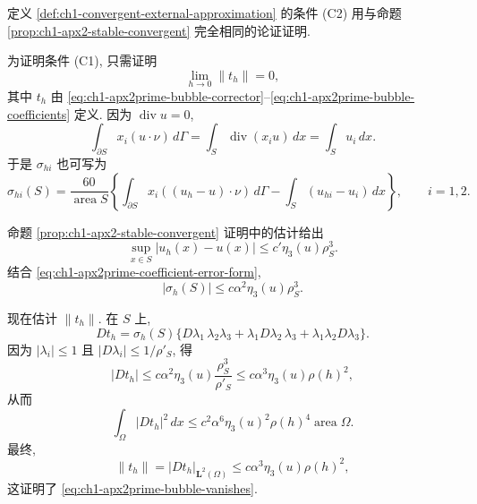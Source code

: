 \begin{Proof}
定义 \ref{def:ch1-convergent-external-approximation} 的条件 (C2) 用与命题 \ref{prop:ch1-apx2-stable-convergent} 完全相同的论证证明.

为证明条件 (C1), 只需证明
\begin{equation}
\lim_{h\to0}\|t_h\|=0,
\label{eq:ch1-apx2prime-bubble-vanishes}
\end{equation}
其中 $t_h$ 由 \eqref{eq:ch1-apx2prime-bubble-corrector}--\eqref{eq:ch1-apx2prime-bubble-coefficients} 定义. 因为 $\operatorname{div}u=0$,
\[
\int_{\partial S}x_i(u\cdot\nu)\,d\Gamma
=\int_S\operatorname{div}(x_iu)\,dx
=\int_Su_i\,dx.
\]
于是 $\sigma_{hi}$ 也可写为
\begin{equation}
\sigma_{hi}(S)
=\frac{60}{\operatorname{area}S}
\left\{\int_{\partial S}x_i((u_h-u)\cdot\nu)\,d\Gamma
-\int_S(u_{hi}-u_i)\,dx\right\},
\qquad i=1,2.
\label{eq:ch1-apx2prime-coefficient-error-form}
\end{equation}

命题 \ref{prop:ch1-apx2-stable-convergent} 证明中的估计给出
\begin{equation}
\sup_{x\in S}|u_h(x)-u(x)|
\leq c'\eta_3(u)\rho_S^3.
\label{eq:ch1-apx2prime-primary-uniform-error}
\end{equation}
结合 \eqref{eq:ch1-apx2prime-coefficient-error-form},
\begin{equation}
|\sigma_h(S)|
\leq c\alpha^2\eta_3(u)\rho_S^3.
\label{eq:ch1-apx2prime-coefficient-bound}
\end{equation}

现在估计 $\|t_h\|$. 在 $S$ 上,
\[
Dt_h=\sigma_h(S)
\{D\lambda_1\,\lambda_2\lambda_3
+\lambda_1D\lambda_2\,\lambda_3
+\lambda_1\lambda_2D\lambda_3\}.
\]
因为 $|\lambda_i|\leq1$ 且 $|D\lambda_i|\leq1/\rho'_S$, 得
\[
|Dt_h|
\leq c\alpha^2\eta_3(u)\frac{\rho_S^3}{\rho'_S}
\leq c\alpha^3\eta_3(u)\rho(h)^2,
\]
从而
\begin{equation}
\int_\Omega|Dt_h|^2\,dx
\leq c^2\alpha^6\eta_3(u)^2\rho(h)^4
\operatorname{area}\Omega.
\label{eq:ch1-apx2prime-bubble-gradient-integral}
\end{equation}
最终,
\begin{equation}
\|t_h\|=|Dt_h|_{\mathbf L^2(\Omega)}
\leq c\alpha^3\eta_3(u)\rho(h)^2,
\label{eq:ch1-apx2prime-bubble-h1-bound}
\end{equation}
这证明了 \eqref{eq:ch1-apx2prime-bubble-vanishes}.
\end{Proof}

